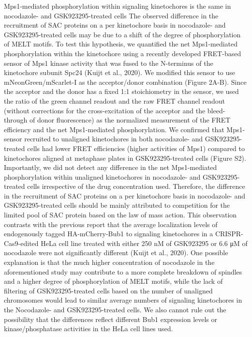 Mps1-mediated phosphorylation within signaling kinetochores is the same in nocodazole- and GSK923295-treated cells
The observed difference in the recruitment of SAC proteins on a per kinetochore basis in nocodazole- and GSK923295-treated cells may be due to a shift of the degree of phosphorylation of MELT motifs. To test this hypothesis, we quantified the net Mps1-mediated phosphorylation within the kinetochore using a recently developed FRET-based sensor of Mps1 kinase activity that was fused to the N-terminus of the kinetochore subunit Spc24 (Kuijt et al., 2020). We modified this sensor to use mNeonGreen/mScarlet-I as the acceptor/donor combination (Figure 2A-B). Since the acceptor and the donor has a fixed 1:1 stoichiometry in the sensor, we used the ratio of the green channel readout and the raw FRET channel readout (without corrections for the cross-excitation of the acceptor and the bleed-through of donor fluorescence) as the normalized measurement of the FRET efficiency and the net Mps1-mediated phosphorylation. 
We confirmed that Mps1-sensor recruited to unaligned kinetochores in both nocodazole- and GSK923295- treated cells had lower FRET efficiencies (higher activities of Mps1) compared to kinetochores aligned at metaphase plates in GSK923295-treated cells (Figure S2). Importantly, we did not detect any difference in the net Mps1-mediated phosphorylation within unaligned kinetochores in nocodazole- and GSK923295-treated cells irrespective of the drug concentration used. Therefore, the difference in the recruitment of SAC proteins on a per kinetochore basis in nocodazole- and GSK923295-treated cells should be mainly attributed to competition for the limited pool of SAC protein based on the law of mass action. This observation contrasts with the previous report that the average localization levels of endogenously tagged HA-mCherry-Bub1 to signaling kinetochores in a CRISPR-Cas9-edited HeLa cell line treated with either 250 nM of GSK923295 or 6.6 μM of nocodazole were not significantly different (Kuijt et al., 2020). One possible explanation is that the much higher concentration of nocodazole in the aforementioned study may contribute to a more complete breakdown of spindles and a higher degree of phosphorylation of MELT motifs, while the lack of filtering of GSK923295-treated cells based on the number of unaligned chromosomes would lead to similar average numbers of signaling kinetochores in the Nocodazole- and GSK923295-treated cells. We also cannot rule out the possibility that the differences reflect different Bub1 expression levels or kinase/phosphatase activities in the HeLa cell lines used.
